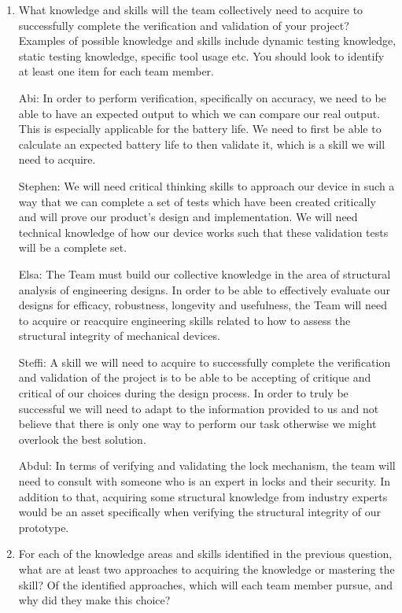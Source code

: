 \documentclass[12pt, titlepage]{article}
\begin{document}
\begin{enumerate}
  \item What knowledge and skills will the team collectively need to acquire to successfully complete the verification and validation of your project?
  Examples of possible knowledge and skills include dynamic testing knowledge, static testing knowledge, specific tool usage etc.  You should look to identify at least one item for each team member.

Abi: In order to perform verification, specifically on accuracy, we need to be able to have an expected output to which we can compare our real output. This is especially applicable for the battery life. We need to first be able to calculate an expected battery life to then validate it, which is a skill we will need to acquire. 

Stephen: We will need critical thinking skills to approach our device in such a way that we can complete a set of tests which have been created critically and will prove our product's design and implementation. We will need technical knowledge of how our device works such that these validation tests will be a complete set.

Elsa: The Team must build our collective knowledge in the area of structural analysis of engineering designs. In order to be able to effectively evaluate our designs for efficacy, robustness, longevity and usefulness, the Team will need to acquire or reacquire engineering skills related to how to assess the structural integrity of mechanical devices.

Steffi: A skill we will need to acquire to successfully complete the verification and validation of the project is to be able to be accepting of critique and critical of our choices during the design process.  In order to truly be successful we will need to adapt to the information provided to us and not believe that there is only one way to perform our task otherwise we might overlook the best solution.

Abdul: In terms of verifying and validating the lock mechanism, the team will need to consult with someone who is an expert in locks and their security. In addition to that, acquiring some structural knowledge from industry experts would be an asset specifically when verifying the structural integrity of our prototype. 

  \item For each of the knowledge areas and skills identified in the previous
  question, what are at least two approaches to acquiring the knowledge or
  mastering the skill?  Of the identified approaches, which will each team
  member pursue, and why did they make this choice?


\end{enumerate}
\end{document}
